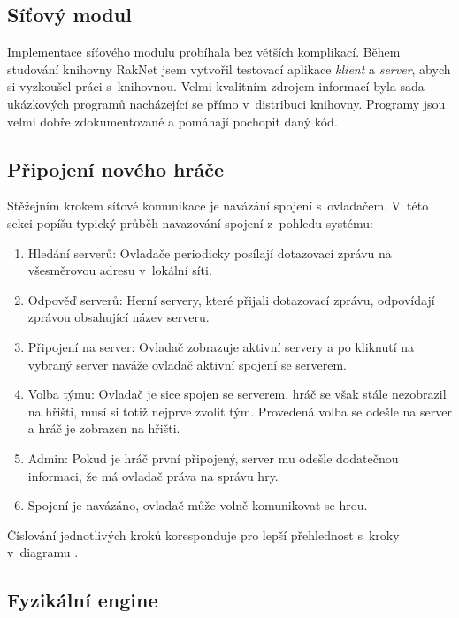 \documentclass[thesis=B,czech,hidelinks]{FITthesis}[2012/06/26] %
\begin{document}

\subsection{Síťový modul}

Implementace síťového modulu probíhala bez větších komplikací. Během studování knihovny RakNet jsem vytvořil testovací aplikace \textit{klient} a \textit{server}, abych si vyzkoušel práci s~knihovnou. Velmi kvalitním zdrojem informací byla sada ukázkových programů nacházející se přímo v~distribuci knihovny. Programy jsou velmi dobře zdokumentované a pomáhají pochopit daný kód.

\subsection{Připojení nového hráče}

Stěžejním krokem síťové komunikace je navázání spojení s~ovladačem. V~této sekci popíšu typický průběh navazování spojení z~pohledu systému:

\begin{enumerate}
	\item Hledání serverů: Ovladače periodicky posílají dotazovací zprávu na všesměrovou adresu v~lokální síti.
	\item Odpověď serverů: Herní servery, které přijali dotazovací zprávu, odpovídají zprávou obsahující název serveru.
	\item Připojení na server: Ovladač zobrazuje aktivní servery a po kliknutí na vybraný server naváže ovladač aktivní spojení se serverem.
	\item Volba týmu: Ovladač je sice spojen se serverem, hráč se však stále nezobrazil na hřišti, musí si totiž nejprve zvolit tým. Provedená volba se odešle na server a hráč je zobrazen na hřišti.
	\item Admin: Pokud je hráč první připojený, server mu odešle dodatečnou informaci, že má ovladač práva na správu hry.
	\item Spojení je navázáno, ovladač může volně komunikovat se hrou.
\end{enumerate}

Číslování jednotlivých kroků koresponduje pro lepší přehlednost s~kroky v~diagramu . 

\subsection{Fyzikální engine}
\end{document}
